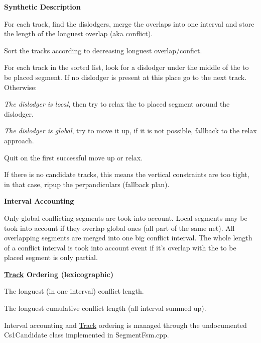 {\bfseries Synthetic Description}


\begin{DoxyEnumerate}
\item For each track, find the dislodgers, merge the overlaps into one interval and store the length of the longuest overlap (aka conflict).
\item Sort the tracks according to decreasing longuest overlap/confict.
\item For each track in the sorted list, look for a dislodger under the middle of the to be placed segment. If no dislodger is present at this place go to the next track. Otherwise\-:
\begin{DoxyItemize}
\item {\itshape The dislodger is local}, then try to relax the to placed segment around the dislodger.
\item {\itshape The dislodger is global}, try to move it up, if it is not possible, fallback to the relax approach.
\end{DoxyItemize}
\item Quit on the first successful move up or relax.
\item If there is no candidate tracks, this means the vertical constraints are too tight, in that case, ripup the perpandiculars (fallback plan).
\end{DoxyEnumerate}

{\bfseries Interval Accounting}

Only global conflicting segments are took into account. Local segments may be took into account if they overlap global ones (all part of the same net). All overlapping segments are merged into one big conflict interval. The whole length of a conflict interval is took into account event if it's overlap with the to be placed segment is only partial.

{\bfseries \hyperlink{classKite_1_1Track}{Track} Ordering (lexicographic)}


\begin{DoxyEnumerate}
\item The longuest (in one interval) conflict length.
\item The longuest cumulative conflict length (all interval summed up).
\end{DoxyEnumerate}

Interval accounting and \hyperlink{classKite_1_1Track}{Track} ordering is managed through the undocumented {\ttfamily Cs1\-Candidate} class implemented in {\ttfamily Segment\-Fsm.\-cpp}.

